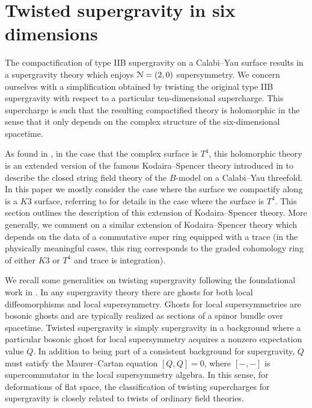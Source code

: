 \documentclass[../main.tex]{subfiles}
\begin{document}
\section{Twisted supergravity in six dimensions}\label{sec:sugra}

The compactification of type IIB supergravity on a Calabi--Yau surface results in a supergravity theory which enjoys $\mathcal{N}=(2,0)$ supersymmetry.
We concern ourselves with a simplification obtained by twisting the original type IIB supergravity with respect to a particular ten-dimensional supercharge.
This supercharge is such that the resulting compactified theory is holomorphic in the sense that it only depends on the complex structure of the six-dimensional spacetime.

As found in \cite{CP}, in the case that the complex surface is $T^4$, this holomorphic theory is an extended version of the famous Kodaira--Spencer theory introduced in \cite{BCOV} to describe the closed string field theory of the $B$-model on a Calabi--Yau threefold.
In this paper we mostly consider the case where the surface we compactify along is a $K3$ surface, referring to \cite{CP} for details in the case where the surface is $T^4$.
This section outlines the description of this extension of Kodaira--Spencer theory. 
More generally, we comment on a similar extension of Kodaira--Spencer theory which depends on the data of a commutative super ring equipped with a trace (in the physically meaningful cases, this ring corresponds to the graded cohomology ring of either $K3$ or $T^4$ and trace is integration).

We recall some generalities on twisting supergravity following the foundational work in \cite{CLsugra}.
In any supergravity theory there are ghosts for both local diffeomorphisms and local supersymmetry.
Ghosts for local supersymmetries are bosonic ghosts and are typically realized as sections of a spinor bundle over spacetime.
Twisted supergravity is simply supergravity in a background where a particular bosonic ghost for local supersymmetry acquires a nonzero expectation value $Q$.
In addition to being part of a consistent background for supergravity, $Q$ must satisfy the Maurer--Cartan equation $[Q,Q] = 0$, where $[-,-]$ is supercommutator in the local supersymmetry algebra.
In this sense, for deformations of flat space, the classification of twisting supercharges for supergravity is closely related to twists of ordinary field theories.
\end{document}
